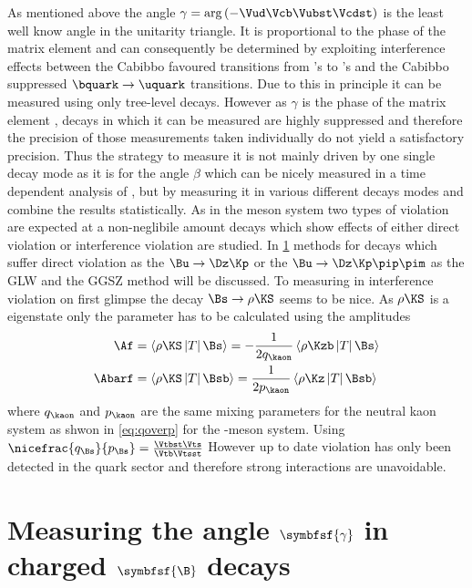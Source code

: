 As mentioned above the angle $\gamma=\arg\left(-\Vud\Vcb\Vubst\Vcdst\right)$ is the least well know angle in the unitarity triangle.
It is proportional to the phase of the matrix element \Vub and can consequently be determined by exploiting interference effects between the Cabibbo favoured transitions from \bquark's to \cquark's and the Cabibbo suppressed $\bquark\to\uquark$ transitions.
Due to this in principle it can be measured using only tree-level decays.
However as $\gamma$ is the phase of the matrix element \Vub, decays in which it can be measured are highly suppressed and therefore the precision of those measurements taken individually do not yield a satisfactory precision.
Thus the strategy to measure it is not mainly driven by one single decay mode as it is for the angle $\beta$ which can be nicely measured in a time dependent analysis of \BdToJPsiKS, but by measuring it in various different decays modes and combine the results statistically.
As in the \B meson system two types of \CP violation are expected at a non-neglibile amount decays which show effects of either direct \CP violation or interference \CP violation are studied.
In \cref{sec:gammainChargedModes} methods for decays which suffer direct \CP violation as the $\Bu\to\Dz\Kp$ or the $\Bu\to\Dz\Kp\pip\pim$ as the GLW and the GGSZ method will be discussed.
To measuring \gamma in interference \CP violation on first glimpse the decay $\Bs\to\rho\KS$ seems to be nice.
As $\rho\KS$ is a \CP eigenstate only the parameter \Lf has to be calculated using the amplitudes
\begin{equation}
\begin{aligned}
\Af&=\left<\rho\KS\left|T\right|\Bs\right>=-\frac{1}{2q_{\kaon}}\left<\rho\Kzb\left|T\right|\Bs\right>\\
\Abarf&=\left<\rho\KS\left|T\right|\Bsb\right>=\frac{1}{2p_{\kaon}}\left<\rho\Kz\left|T\right|\Bsb\right>
\end{aligned}
\end{equation}
where $q_{\kaon}$ and $p_{\kaon}$ are the same mixing parameters for the neutral kaon system as shwon in \cref{eq:qoverp} for the \B-meson system.
Using $\nicefrac{q_{\Bs}}{p_{\Bs}}=\frac{\Vtbst\Vts}{\Vtb\Vtsst}$
However up to date \CP violation has only been detected in the quark sector and therefore strong interactions are unavoidable.



\section[head={Measuring the angle $\gamma$ in charged \B decays},tocentry={Measuring the angle $\gamma$ in charged \B decays}]{Measuring the angle $\symbfsf{\gamma}$ in charged $\symbfsf{\B}$ decays}
\label{sec:gammainChargedModes}

